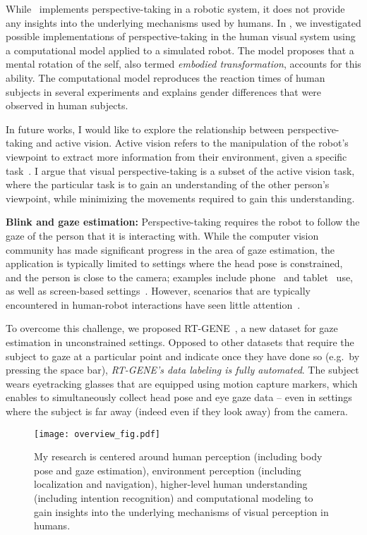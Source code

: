 \documentclass[conference]{IEEEtran}
\begin{document}
While~\cite{Fischer2016} implements perspective-taking in a robotic system, it does not provide any insights into the underlying mechanisms used by humans. In \cite{FischerTCDS2020}, we investigated possible implementations of perspective-taking in the human visual system using a computational model applied to a simulated robot. The model proposes that a mental rotation of the self, also termed \emph{embodied transformation}, accounts for this ability. The computational model reproduces the reaction times of human subjects in several experiments and explains gender differences that were observed in human subjects.

In future works, I would like to explore the relationship between perspective-taking and active vision. Active vision refers to the manipulation of the robot's viewpoint to extract more information from their environment, given a specific task~\cite{Bajcsy2018}. I argue that visual perspective-taking is a subset of the active vision task, where the particular task is to gain an understanding of the other person's viewpoint, while minimizing the movements required to gain this understanding.

\textbf{Blink and gaze estimation: }Perspective-taking requires the robot to follow the gaze of the person that it is interacting with. While the computer vision community has made significant progress in the area of gaze estimation, the application is typically limited to settings where the head pose is constrained, and the person is close to the camera; examples include phone~\cite{Krafka2016} and tablet~\cite{Huang2017} use, as well as screen-based settings~\cite{Zhang2019}. However, scenarios that are typically encountered in human-robot interactions have seen little attention~\cite{lanillos2017bayesian,Schillingmann2015,palinko2015eye}.

To overcome this challenge, we proposed RT-GENE~\cite{FischerECCV2018}, a new dataset for gaze estimation in unconstrained settings. Opposed to other datasets that require the subject to gaze at a particular point and indicate once they have done so (e.g.~by pressing the space bar), \emph{RT-GENE's data labeling is fully automated}. The subject wears eyetracking glasses that are equipped using motion capture markers, which enables to simultaneously collect head pose and eye gaze data -- even in settings where the subject is far away (indeed even if they look away) from the camera.

\begin{figure}
    \centering
    \texttt{[image: overview\_fig.pdf]}
    \caption{My research is centered around human perception (including body pose and gaze estimation), environment perception (including localization and navigation), higher-level human understanding (including intention recognition) and computational modeling to gain insights into the underlying mechanisms of visual perception in humans.}
    \vspace{-\baselineskip}
    \label{fig:main}
\end{figure}
\end{document}
